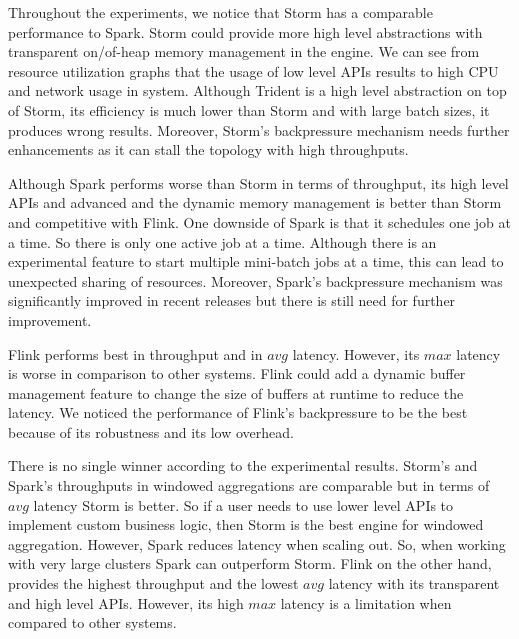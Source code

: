 {%

 
Throughout the experiments, we notice that Storm has a comparable performance  to Spark. Storm could provide more high level abstractions  with transparent on/of-heap memory management in the engine. We can see from resource utilization graphs that the usage of low level APIs results to high CPU and network usage in system.  Although Trident is a high level abstraction on top of Storm, its efficiency is much lower than Storm and with large batch sizes, it produces wrong results. Moreover, Storm's backpressure mechanism needs further enhancements as it can stall the topology with high throughputs.

Although Spark performs worse than Storm in terms of throughput, its high level APIs and advanced and the dynamic memory management is better than Storm and competitive with Flink. One downside of Spark is that it schedules one job at a time. So there is only one active job at a time.  Although there is an experimental feature to start multiple mini-batch jobs at a time, this can lead to unexpected sharing of resources. Moreover, Spark's backpressure mechanism was significantly improved  in recent releases but there is still need for further improvement. 

Flink performs best in throughput and in $avg$ latency. However, its $max$ latency is worse in comparison to other systems. Flink could add a dynamic buffer management feature to change the size of buffers at runtime to reduce the latency. We noticed the performance of Flink's backpressure to be the best because of its robustness and its low overhead.


There is no single winner according to the experimental results. Storm's and Spark's throughputs in windowed aggregations are comparable but in terms of $avg$ latency Storm is better. So if a user needs to use lower level APIs to implement custom business logic, then Storm is the best engine for windowed aggregation. However, Spark reduces latency when scaling out. So, when working with very large clusters Spark can outperform Storm. Flink on the other hand, provides the highest throughput and the lowest  $avg$ latency with its transparent and high level APIs. However, its  high $max$ latency is a limitation when compared to other systems.  







}
